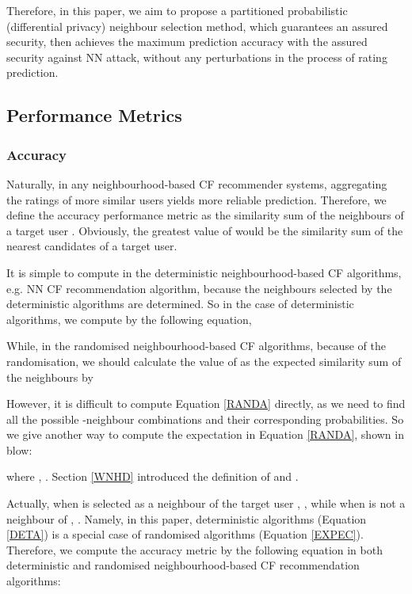 \documentclass[11pt]{article}
\begin{document}
Therefore, in this paper, we aim to propose a partitioned probabilistic (differential privacy) neighbour selection method, which guarantees an assured security, then achieves the maximum prediction accuracy with the assured security against NN attack, without any perturbations in the process of rating prediction.

\subsection{Performance Metrics}
\subsubsection{Accuracy}
Naturally, in any neighbourhood-based CF recommender systems, aggregating the ratings of more similar users yields more reliable prediction. Therefore, we define the accuracy performance metric  as the similarity sum of the  neighbours of a target user . Obviously, the greatest value of  would be the similarity sum of the  nearest candidates of a target user.

It is simple to compute  in the deterministic neighbourhood-based CF algorithms, e.g. NN CF recommendation algorithm, because the  neighbours selected by the deterministic algorithms are determined. So in the case of deterministic algorithms, we compute  by the following equation,


While, in the randomised neighbourhood-based CF algorithms, because of the randomisation, we should calculate the value of  as the expected similarity sum of the  neighbours by


However, it is difficult to compute Equation \eqref{RANDA} directly, as we need to find all the possible -neighbour combinations and their corresponding probabilities. So we give another way to compute the expectation in Equation \eqref{RANDA}, shown in blow:

where , . Section \ref{WNHD} introduced the definition of  and .

Actually, when  is selected as a neighbour of the target user , , while when  is not a neighbour of , . Namely, in this paper, deterministic algorithms (Equation \eqref{DETA}) is a special case of randomised algorithms (Equation \eqref{EXPEC}). Therefore, we compute the accuracy metric  by the following equation in both deterministic and randomised neighbourhood-based CF recommendation algorithms:
\end{document}

